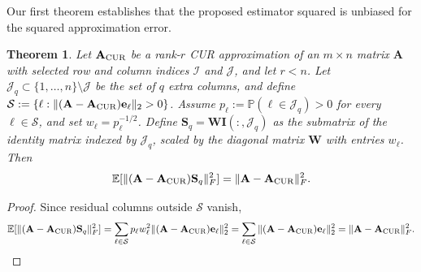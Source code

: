 \documentclass[11pt]{article}
\newcommand{\curX}{\mathbf{A}_{\textup{CUR}}}
\newtheorem{theorem}{Theorem}
\begin{document}
Our first theorem establishes that the proposed estimator squared is unbiased for the squared approximation error.
\begin{theorem} \label{thm:unbiased}
    Let $\curX$ be a rank-$r$ CUR approximation of an $m\times n$ matrix $\mathbf{A}$ with selected row and column indices $\mathcal{I}$ and $\mathcal{J}$, and let $r<n$.
    Let $\mathcal{J}_q\subset\{1,\dots,n\}\setminus\mathcal{J}$ be the set of $q$ extra columns, and define
    $\mathcal{S}:=\{\ell:\|(\mathbf{A}-\curX)\mathbf{e}_{\ell}\|_2>0\}$.
    Assume $p_{\ell}:=\mathbb{P}(\ell\in\mathcal{J}_q)>0$ for every $\ell\in\mathcal{S}$, and set $w_{\ell}=p_{\ell}^{-1/2}$. Define $\mathbf{S}_q=\mathbf{W}\mathbf{I}(:,\mathcal{J}_q)$ as the submatrix of the identity matrix indexed by $\mathcal{J}_q$, scaled by the diagonal matrix $\mathbf{W}$ with entries $w_{\ell}$.
    Then
    \begin{equation}
        \mathbb{E}[\|(\mathbf{A}-\curX)\mathbf{S}_q\|_F^2]=\|\mathbf{A}-\curX\|_F^2.
    \end{equation}
\end{theorem}
\begin{proof}
    Since residual columns outside $\mathcal{S}$ vanish,
    \begin{equation*}
        \mathbb{E}[\|(\mathbf{A}-\curX)\mathbf{S}_q\|_F^2]
        =\sum_{\ell\in\mathcal{S}}p_{\ell}w_{\ell}^2\|(\mathbf{A}-\curX)\mathbf{e}_{\ell}\|_2^2
        =\sum_{\ell\in\mathcal{S}}\|(\mathbf{A}-\curX)\mathbf{e}_{\ell}\|_2^2
        =\|\mathbf{A}-\curX\|_F^2.
    \end{equation*}
\end{proof}
\end{document}
